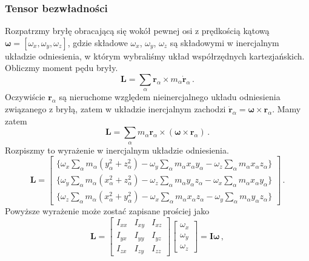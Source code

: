 \documentclass[../main.tex]{subfiles}
\begin{document}
\subsubsection{Tensor bezwładności}
Rozpatrzmy bryłę obracającą się wokół pewnej osi z prędkością kątową
\(\boldsymbol{\omega}=[\omega_x,\omega_y,\omega_z]\), gdzie składowe \(\omega_x\), \(\omega_y\),
\(\omega_z\) są składowymi w inercjalnym układzie odniesienia, w którym wybraliśmy układ
współrzędnych kartezjańskich. Obliczmy moment pędu bryły.
\begin{equation*}
    \mathbf{L}=\sum_\alpha\mathbf{r}_\alpha\times m_\alpha\dot{\mathbf{r}}_\alpha\,.
\end{equation*}
Oczywiście \(\mathbf{r}_\alpha\) są nieruchome względem nieinercjalnego układu odniesienia
związanego z bryłą, zatem w układzie inercjalnym zachodzi
\(\dot{\mathbf{r}}_\alpha=\boldsymbol{\omega}\times\mathbf{r}_\alpha\). Mamy zatem
\begin{equation*}
    \mathbf{L}=\sum_\alpha m_\alpha\mathbf{r}_\alpha\times (\boldsymbol{\omega}\times\boldsymbol{r}_\alpha)\,.
\end{equation*}
Rozpiszmy to wyrażenie w inercjalnym układzie odniesienia.
\begin{equation*}
    \mathbf{L}=\begin{bmatrix} \{\omega_x\sum_\alpha m_\alpha (y_\alpha^2+z_\alpha^2)-\omega_y\sum_\alpha m_\alpha x_\alpha y_\alpha- \omega_z\sum_\alpha m_\alpha x_\alpha z_\alpha\}\\
    \{\omega_y\sum_\alpha m_\alpha (x_\alpha^2+z_\alpha^2)-\omega_z\sum_\alpha m_\alpha y_\alpha z_\alpha- \omega_x\sum_\alpha m_\alpha x_\alpha y_\alpha\}\\
    \{\omega_z\sum_\alpha m_\alpha (x_\alpha^2+y_\alpha^2)-\omega_x\sum_\alpha m_\alpha x_\alpha z_\alpha- \omega_y\sum_\alpha m_\alpha y_\alpha z_\alpha\}
    \end{bmatrix}\,.
\end{equation*}
Powyższe wyrażenie może zostać zapisane prościej jako
\begin{equation*}
    \mathbf{L}=\begin{bmatrix} I_{xx}&I_{xy}&I_{xz}\\I_{yx}&I_{yy}&I_{yz}\\I_{zx}&I_{zy}&I_{zz}\end{bmatrix}\begin{bmatrix}\omega_x\\\omega_y\\\omega_z\end{bmatrix}=\mathbf{I}\boldsymbol{\omega}\,,
\end{equation*}
\end{document}
